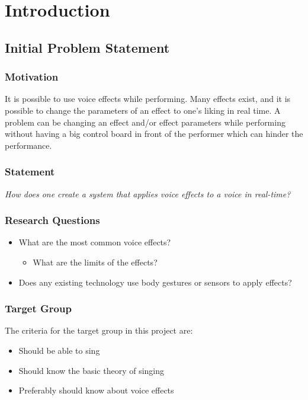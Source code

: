 \chapter{Introduction}\label{ch:Intro}

\section{Initial Problem Statement}

\subsection{Motivation}

It is possible to use voice effects while performing. Many effects exist, and it is possible to change the parameters of an effect to one's liking in real time. 
A problem can be changing an effect and/or effect parameters while performing without having a big control board in front of the performer which can hinder the performance. 

\subsection{Statement}

\textit{How does one create a system that applies voice effects to a voice in real-time?}


\subsection{Research Questions}\label{sub:ResearchQ}

\begin{itemize}
	\item What are the most common voice effects?
	\begin{itemize}
		\item What are the limits of the effects? 
	\end{itemize}
	\item Does any existing technology use body gestures or sensors to apply effects?
\end{itemize}

\subsection{Target Group}
The criteria for the target group in this project are:
\begin{itemize}
	\item Should be able to sing 
	\item Should know the basic theory of singing
	\item Preferably should know about voice effects
\end{itemize}

